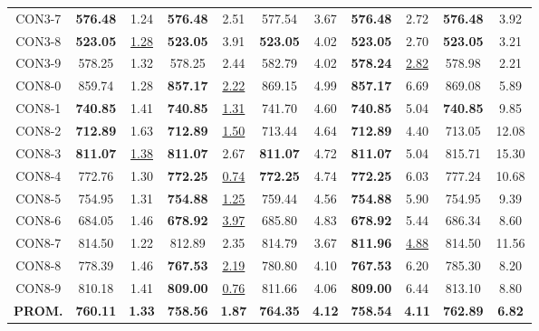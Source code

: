 \begin{table}[h]
\begin{tabular*}{1.00\textwidth}{@{\extracolsep{\fill}} |c||c c|c c|c c|c c|c c|}
CON3-7 & \textbf{576.48} & 1.24 & \textbf{576.48} & 2.51 & 577.54 & 3.67 & \textbf{576.48} & 2.72 & \textbf{576.48} & 3.92\\
CON3-8 & \textbf{523.05} & \underline{1.28} & \textbf{523.05} & 3.91 & \textbf{523.05} & 4.02 & \textbf{523.05} & 2.70 & \textbf{523.05} & 3.21\\
CON3-9 & 578.25 & 1.32 & 578.25 & 2.44 & 582.79 & 4.02 & \textbf{578.24} & \underline{2.82} & 578.98 & 2.21\\
CON8-0 & 859.74 & 1.28 & \textbf{857.17} & \underline{2.22} & 869.15 & 4.99 & \textbf{857.17} & 6.69 & 869.08 & 5.89\\
CON8-1 & \textbf{740.85} & 1.41 & \textbf{740.85} & \underline{1.31} & 741.70 & 4.60 & \textbf{740.85} & 5.04 & \textbf{740.85} & 9.85\\
CON8-2 & \textbf{712.89} & 1.63 & \textbf{712.89} & \underline{1.50} & 713.44 & 4.64 & \textbf{712.89} & 4.40 & 713.05 & 12.08\\
CON8-3 & \textbf{811.07} & \underline{1.38} & \textbf{811.07} & 2.67 & \textbf{811.07} & 4.72 & \textbf{811.07} & 5.04 & 815.71 & 15.30\\
CON8-4 & 772.76 & 1.30 & \textbf{772.25} & \underline{0.74} & \textbf{772.25} & 4.74 & \textbf{772.25} & 6.03 & 777.24 & 10.68\\
CON8-5 & 754.95 & 1.31 & \textbf{754.88} & \underline{1.25} & 759.44 & 4.56 & \textbf{754.88} & 5.90 & 754.95 & 9.39\\
CON8-6 & 684.05 & 1.46 & \textbf{678.92} & \underline{3.97} & 685.80 & 4.83 & \textbf{678.92} & 5.44 & 686.34 & 8.60\\
CON8-7 & 814.50 & 1.22 & 812.89 & 2.35 & 814.79 & 3.67 & \textbf{811.96} & \underline{4.88} & 814.50 & 11.56\\
CON8-8 & 778.39 & 1.46 & \textbf{767.53} & \underline{2.19} & 780.80 & 4.10 & \textbf{767.53} & 6.20 & 785.30 & 8.20\\
CON8-9 & 810.18 & 1.41 & \textbf{809.00} & \underline{0.76} & 811.66 & 4.06 & \textbf{809.00} & 6.44 & 813.10 & 8.80\\
\hline\hline
\textbf{PROM.} & \textbf{760.11} & \textbf{1.33} & \textbf{758.56} & \textbf{1.87} & \textbf{764.35} & \textbf{4.12} & \textbf{758.54} & \textbf{4.11} & \textbf{762.89} & \textbf{6.82} \\[1ex]\hline
\end{tabular*}
\label{tabla-final-comparativaD}
\end{table}

